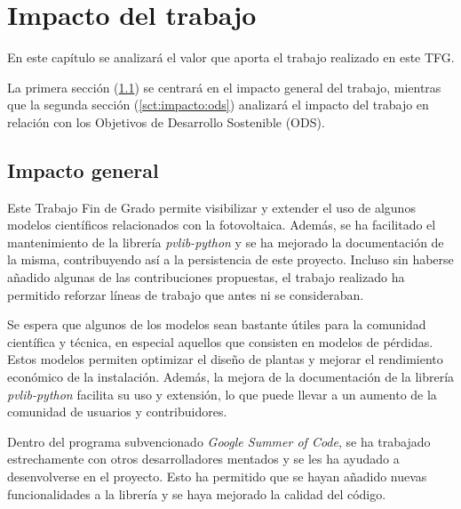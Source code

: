\chapter{Impacto del trabajo} \label{chp:impacto}

En este capítulo se analizará el valor que aporta el trabajo realizado en este TFG.

La primera sección (\ref{sct:impacto:general}) se centrará en el impacto general del trabajo, mientras que la segunda sección (\ref{sct:impacto:ods}) analizará el impacto del trabajo en relación con los Objetivos de Desarrollo Sostenible (ODS).


\section{Impacto general} \label{sct:impacto:general}

Este Trabajo Fin de Grado permite visibilizar y extender el uso de algunos modelos científicos relacionados con la fotovoltaica. Además, se ha facilitado el mantenimiento de la librería \textit{pvlib-python} y se ha mejorado la documentación de la misma, contribuyendo así a la persistencia de este proyecto. Incluso sin haberse añadido algunas de las contribuciones propuestas, el trabajo realizado ha permitido reforzar líneas de trabajo que antes ni se consideraban.

Se espera que algunos de los modelos sean bastante útiles para la comunidad científica y técnica, en especial aquellos que consisten en modelos de pérdidas. Estos modelos permiten optimizar el diseño de plantas y mejorar el rendimiento económico de la instalación. Además, la mejora de la documentación de la librería \textit{pvlib-python} facilita su uso y extensión, lo que puede llevar a un aumento de la comunidad de usuarios y contribuidores.

Dentro del programa subvencionado \textit{Google Summer of Code}, se ha trabajado estrechamente con otros desarrolladores mentados y se les ha ayudado a desenvolverse en el proyecto. Esto ha permitido que se hayan añadido nuevas funcionalidades a la librería y se haya mejorado la calidad del código.


